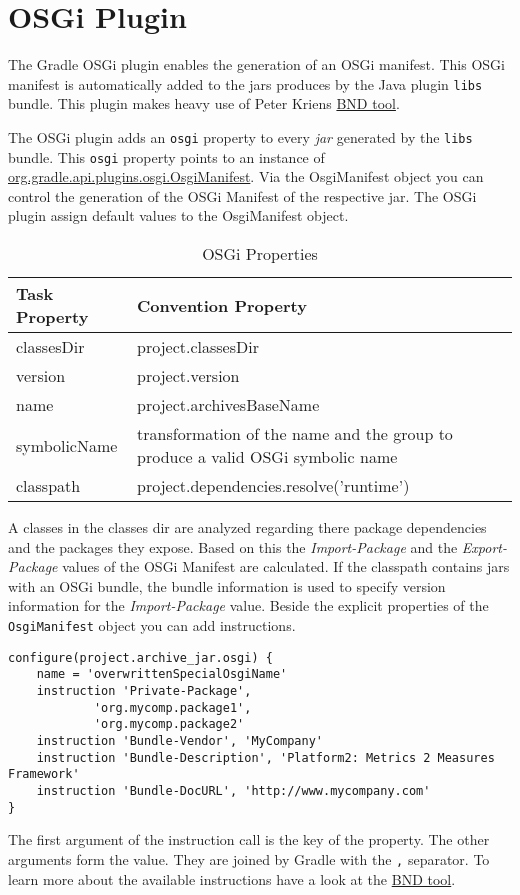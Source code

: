 \chapter{OSGi Plugin} %
\label{cha:osgi_plugin}
The Gradle OSGi plugin enables the generation of an OSGi manifest. This OSGi manifest is automatically added to the jars produces by the Java plugin \texttt{libs} bundle. This plugin makes heavy use of Peter Kriens \href{http://www.aqute.biz/Code/Bnd}{BND tool}. 

The OSGi plugin adds an \texttt{osgi} property to every \emph{jar} generated by the \texttt{libs} bundle. This \texttt{osgi} property points to an instance of \href{\API plugins.osgi/OsgiManifest.html}{org.gradle.api.plugins.osgi.OsgiManifest}. Via the OsgiManifest object you can control the generation of the OSGi Manifest of the respective jar. The OSGi plugin assign default values to the OsgiManifest object. 
\begin{table}
\begin{center}
	\begin{tabular}{|l|l|l|} \hline
		Task Property & Convention Property \\ \hline
		classesDir & project.classesDir \\ \hline
		version & project.version \\ \hline
		name & project.archivesBaseName \\ \hline
		symbolicName & transformation of the name and the group to produce a valid OSGi symbolic name \\ \hline		
		classpath & project.dependencies.resolve('runtime') \\ \hline		
	\end{tabular}
\end{center}
\caption{OSGi Properties}
\end{table}
A classes in the classes dir are analyzed regarding there package dependencies and the packages they expose. Based on this the \emph{Import-Package} and the \emph{Export-Package} values of the OSGi Manifest are calculated. If the classpath contains jars with an OSGi bundle, the bundle information is used to specify version information for the \emph{Import-Package} value. Beside the explicit properties of the \texttt{OsgiManifest} object you can add instructions.
\begin{Verbatim}
configure(project.archive_jar.osgi) {
    name = 'overwrittenSpecialOsgiName'
    instruction 'Private-Package',
            'org.mycomp.package1',
            'org.mycomp.package2'
    instruction 'Bundle-Vendor', 'MyCompany'
    instruction 'Bundle-Description', 'Platform2: Metrics 2 Measures Framework'
    instruction 'Bundle-DocURL', 'http://www.mycompany.com'
}
\end{Verbatim}
The first argument of the instruction call is the key of the property. The other arguments form the value. They are joined by Gradle with the \texttt{,} separator. To learn more about the available instructions have a look at the \href{http://www.aqute.biz/Code/Bnd}{BND tool}.
